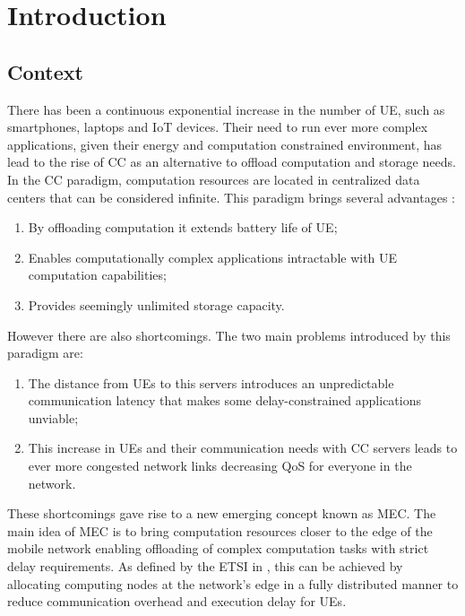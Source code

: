 \chapter{Introduction}
\label{chapter:introduction}
\setcounter{page}{1}
\section{Context}
\noindent There has been a continuous exponential increase in the number of \acrfull{UE}, such as smartphones, laptops and \acrfull{IoT} devices. Their need to run ever more complex applications, given their energy and computation constrained environment, has lead to the rise of \acrfull{CC} as an alternative to offload computation and storage needs. In the \acrshort{CC} paradigm, computation resources are located in centralized data centers that can be considered infinite. This paradigm brings several advantages \cite{SHAKARAMI2020107496}: 
\begin{enumerate}
    \item By offloading computation it extends battery life of \acrshort{UE}; 
    \item Enables computationally complex applications intractable with \acrshort{UE} computation capabilities;
    \item Provides seemingly unlimited storage capacity.
\end{enumerate}
However there are also shortcomings. The two main problems introduced by this paradigm are: 
\begin{enumerate}
    \item The distance from \acrshort{UE}s to this servers introduces an unpredictable communication latency that makes some delay-constrained applications unviable;
    \item  This increase in \acrshort{UE}s and their communication needs with \acrshort{CC} servers leads to ever more congested network links decreasing \acrfull{QoS} for everyone in the network.
\end{enumerate}

\par
These shortcomings gave rise to a new emerging concept known as \acrfull{MEC}. The main idea of \acrshort{MEC} is to bring computation resources closer to the edge of the mobile network enabling offloading of complex computation tasks with strict delay requirements. As defined by the \acrfull{ETSI} in \cite{MECspec}, this can be achieved by allocating computing nodes at the network's edge in a fully distributed manner to reduce communication overhead and execution delay for \acrshort{UE}s.

